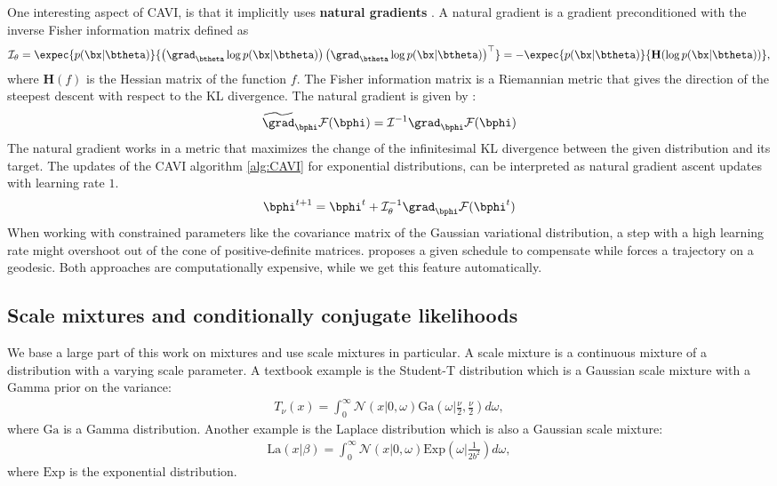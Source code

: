 One interesting aspect of \ac{CAVI}, is that it implicitly uses \textbf{natural gradients} \cite{amariNaturalGradientWorks1998}.
A natural gradient is a gradient preconditioned with the inverse Fisher information matrix defined as
\begin{align}
    \mathcal{I}_\theta = \expec{p(\bx|\btheta)}{\left(\grad_{\btheta}\log p(\bx|\btheta)\right)\left(\grad_{\btheta} \log p(\bx|\btheta)\right)^\top} = -\expec{p(\bx|\btheta)}{\mathbf{H}(\log p(\bx|\btheta))},
    \label{eq:fisherinfomatrix}
\end{align}
where $\mathbf{H}(f)$ is the Hessian matrix of the function $f$.
The Fisher information matrix is a Riemannian metric that gives the direction of the steepest descent with respect to the \ac{KL} divergence.
The natural gradient is given by :
\begin{align*}
    \widetilde{\grad}_{\bphi}\mathcal{F}(\bphi) = \mathcal{I}^{-1} \grad_{\bphi}\mathcal{F}(\bphi)
\end{align*}
The natural gradient works in a metric that maximizes the change of the infinitesimal \ac{KL} divergence between the given distribution and its target\cite{salimbeniNaturalGradientsPractice2018}.
The updates of the \ac{CAVI} algorithm \ref{alg:CAVI} for exponential distributions, can be interpreted as natural gradient ascent updates with learning rate $1$.
\begin{align*}
    \bphi^{t+1} = \bphi^t + \mathcal{I}^{-1}_\theta\grad_{\bphi}\mathcal{F}(\bphi^t)
\end{align*}
When working with constrained parameters like the covariance matrix of the Gaussian variational distribution, a step with a high learning rate might overshoot out of the cone of positive-definite matrices.
\citet{salimbeniNaturalGradientsPractice2018} proposes a given schedule to compensate while \citet{linHandlingPositiveDefiniteConstraint2020} forces a trajectory on a geodesic.
Both approaches are computationally expensive, while we get this feature automatically.

\subsection{Scale mixtures and conditionally conjugate likelihoods}
\label{sec:scale-mixtures}
We base a large part of this work on mixtures and use scale mixtures in particular.
A scale mixture is a continuous mixture of a distribution with a varying scale parameter.
A textbook example is the Student-T distribution which is a Gaussian scale mixture with a Gamma prior on the variance:
\begin{align*}
    T_\nu(x) = \int_{0}^\infty \mathcal{N}\left(x|0,\omega\right)\mathrm{Ga}\left(\omega|\frac{\nu}{2}, \frac{\nu}{2}\right)d\omega,
\end{align*}
where $\mathrm{Ga}$ is a Gamma distribution.
Another example is the Laplace distribution which is also a Gaussian scale mixture:
\begin{align*}
    \mathrm{La}(x|\beta) = \int_0^{\infty} \mathcal{N}(x|0,\omega)\mathrm{Exp}\left(\omega|\frac{1}{2b^2}\right)d\omega,
\end{align*}
where $\mathrm{Exp}$ is the exponential distribution.

